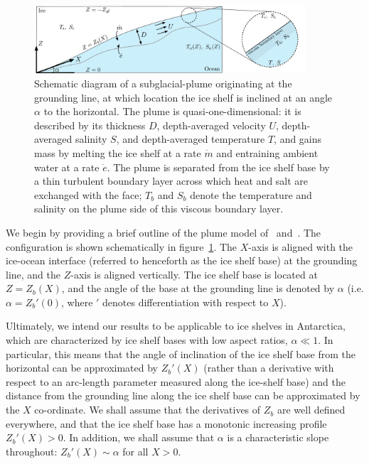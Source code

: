 \documentclass{jfm}
\begin{document}
\begin{figure}
\centering
\includegraphics[width = 0.9\textwidth]{fig1_schematic}
\caption{Schematic diagram of a subglacial-plume originating at the grounding line, at which location the ice shelf is inclined at an angle $\alpha$ to the horizontal. The plume is quasi-one-dimensional: it is described by its thickness $D$, depth-averaged velocity $U$, depth-averaged salinity $S$, and depth-averaged temperature $T$, and gains mass by melting the ice shelf at a rate $\dot{m}$ and entraining ambient water at a rate $\dot{e}$. The plume is separated from the ice shelf base by a thin turbulent boundary layer across which heat and salt are exchanged with the face; $T_b$ and $S_b$ denote the temperature and salinity on the plume side of this viscous boundary layer. }\label{fig:Schematic}
\end{figure}

We begin by providing a brief outline of the plume model of~\cite{Jenkins1991JGeophysResOceans} and~\cite{Jenkins2011JPhysOcean}. The configuration is shown schematically in figure~\ref{fig:Schematic}. The $X$-axis is aligned with the ice-ocean interface (referred to henceforth as the ice shelf base) at the grounding line, and the $Z$-axis is aligned vertically. The ice shelf base is located at $Z = Z_b(X)$, and the angle of the base at the grounding line is denoted by $\alpha$ (i.e. $\alpha = Z_b'(0)$, where $'$ denotes differentiation with respect to $X$).

Ultimately, we intend our results to  be applicable to ice shelves in Antarctica, which are characterized by ice shelf bases with low aspect ratios, $\alpha \ll 1$. In particular, this means that the angle of inclination of the ice shelf base from the horizontal can be approximated by $Z_b'(X)$ (rather than a derivative with respect to an arc-length parameter measured along the ice-shelf base) and the distance from the grounding line along the ice shelf base can be approximated by the $X$ co-ordinate. We shall assume that the derivatives of $Z_b$ are well defined everywhere, and that the ice shelf base has a monotonic increasing profile $Z_b'(X) >0$. In addition, we shall assume that $\alpha$ is a characteristic slope throughout: $Z_b'(X)\sim \alpha$ for all $X >0$. 
\end{document}
